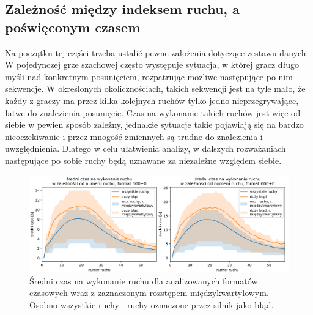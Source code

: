 \documentclass[inzynierska]{pwr_wmat_praca_dyplomowa}
\theoremstyle{plain}
\numberwithin{theorem}{chapter}
\theoremstyle{definition}
\numberwithin{theorem}{chapter}
\begin{document}
\subsection{Zależność między indeksem ruchu, a poświęconym czasem}


Na początku tej części trzeba ustalić pewne założenia dotyczące zestawu danych. W pojedynczej grze szachowej często występuje sytuacja, w której gracz długo myśli nad konkretnym posunięciem, rozpatrując możliwe następujące po nim sekwencje. W określonych okolicznościach, takich sekwencji jest na tyle mało, że każdy z graczy ma przez kilka kolejnych ruchów tylko jedno nieprzegrywające, łatwe do znalezienia posunięcie. Czas na wykonanie takich ruchów jest więc od siebie w pewien sposób zależny, jednakże sytuacje takie pojawiają się na bardzo nieoczekiwanie i przez mnogość zmiennych są trudne do znalezienia i uwzględnienia. Dlatego w celu ułatwienia analizy, w dalszych rozważaniach następujące po sobie ruchy będą uznawane za niezależne względem siebie.
\begin{figure}[H]
	\centering
	\includegraphics[width=\textwidth]{sr_czas_na_ruch.png}
	\caption{Średni czas na wykonanie ruchu dla analizowanych formatów czasowych wraz z zaznaczonym rozstępem międzykwartylowym. Osobno wszystkie ruchy i ruchy oznaczone przez silnik jako błąd.}
	\label{rys:sr_czas_na_ruch}
\end{figure}
\end{document}
